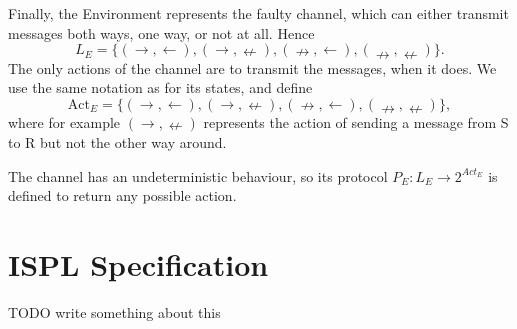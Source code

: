 \documentclass[11pt]{report}
\begin{document}
Finally, the Environment represents the faulty channel, which can either transmit messages both ways, one way, or not at all. Hence $$L_E = \{(\rightarrow, \leftarrow), (\rightarrow, \nleftarrow), (\nrightarrow, \leftarrow), (\nrightarrow, \nleftarrow)\}.$$
The only actions of the channel are to transmit the messages, when it does. We use the same notation as for its states, and define $$\mbox{Act}_E = \{(\rightarrow, \leftarrow), (\rightarrow, \nleftarrow), (\nrightarrow, \leftarrow), (\nrightarrow, \nleftarrow)\}, $$ where for example $(\rightarrow, \nleftarrow)$ represents the action of sending a message from S to R but not the other way around.

The channel has an undeterministic behaviour, so its protocol $P_E: L_E \longrightarrow 2^{Act_E}$ is defined to return any possible action. 

\section{ISPL Specification}

TODO write something about this
\end{document}
